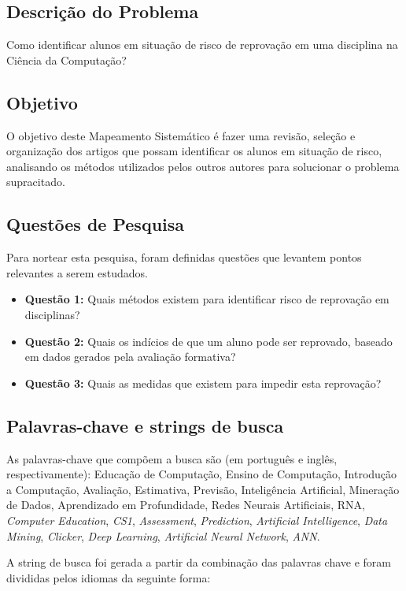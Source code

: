 \documentclass[12pt]{article}
\begin{document}
\subsection{Descrição do Problema}
Como identificar alunos em situação de risco de reprovação em uma disciplina na Ciência da Computação?

\subsection{Objetivo}
O objetivo deste Mapeamento Sistemático é fazer uma revisão, seleção e organização dos artigos que possam identificar os alunos em situação de risco, analisando os métodos utilizados pelos outros autores para solucionar o problema supracitado.

\subsection{Questões de Pesquisa}
Para nortear esta pesquisa, foram definidas questões que levantem pontos relevantes a serem estudados.

\begin{itemize}
    \item \textbf{Questão 1:} Quais métodos existem para identificar risco de reprovação em disciplinas?
    \item \textbf{Questão 2:} Quais os indícios de que um aluno pode ser reprovado, baseado em dados gerados pela avaliação formativa?
    \item \textbf{Questão 3:} Quais as medidas que existem para impedir esta reprovação?
\end{itemize}

\subsection{Palavras-chave e strings de busca}
As palavras-chave que compõem a busca são (em português e inglês, respectivamente): Educação de Computação, Ensino de Computação, Introdução a Computação, Avaliação, Estimativa, Previsão, Inteligência Artificial, Mineração de Dados, Aprendizado em Profundidade, Redes Neurais Artificiais, RNA, \textit{Computer Education}, \textit{CS1}, \textit{Assessment}, \textit{Prediction}, \textit{Artificial Intelligence}, \textit{Data Mining}, \textit{Clicker}, \textit{Deep Learning}, \textit{Artificial Neural Network}, \textit{ANN}.

A string de busca foi gerada a partir da combinação das palavras chave e foram divididas pelos idiomas da seguinte forma: 
\end{document}
